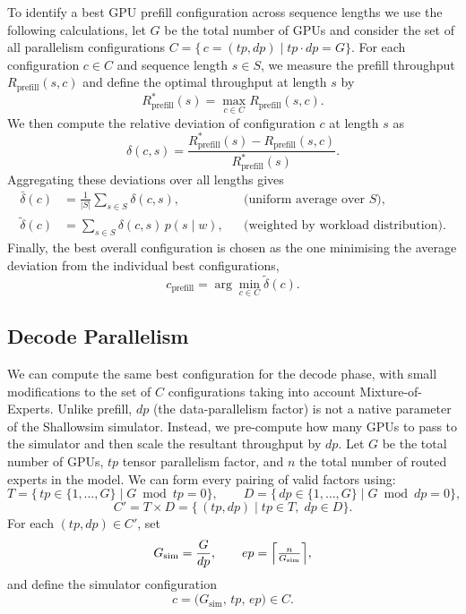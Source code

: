 To identify a best GPU prefill configuration across sequence lengths we use the following calculations, let \(G\) be the total number of GPUs and consider the set of all parallelism configurations $C = \{\,c = (\mathit{tp},\mathit{dp}) \mid \mathit{tp}\cdot\mathit{dp} = G\}$.
For each configuration \(c\in C\) and sequence length \(s\in S\), we measure the prefill throughput \(R_{\mathrm{prefill}}(s,c)\) and define the optimal throughput at length \(s\) by
\[
R_{\mathrm{prefill}}^*(s) = \max_{c\in C} R_{\mathrm{prefill}}(s,c).
\]
We then compute the relative deviation of configuration \(c\) at length \(s\) as
\[
\delta(c,s) = \frac{R_{\mathrm{prefill}}^*(s) - R_{\mathrm{prefill}}(s,c)}{R_{\mathrm{prefill}}^*(s)}.
\]
Aggregating these deviations over all lengths gives
\[
\begin{aligned}
\bar{\delta}(c) &= \frac{1}{\lvert S\rvert} \sum_{s\in S} \delta(c,s), 
&&\text{(uniform average over \(S\))},\\
\widetilde{\delta}(c) &= \sum_{s\in S} \delta(c,s)\,p(s\mid w),
&&\text{(weighted by workload distribution)}.
\end{aligned}
\]
Finally, the best overall configuration is chosen as the one minimising the average deviation from the individual best configurations,
\[
c_{\mathrm{prefill}} = \arg\min_{c\in C} \widetilde{\delta}(c).
\]

\subsection{Decode Parallelism}
\label{chap:decode-parallelism}

We can compute the same best configuration for the decode phase, with small modifications to the set of $C$ configurations taking into account Mixture-of-Experts.
Unlike prefill, \(dp\) (the data-parallelism factor) is not a native parameter of the Shallowsim simulator.
Instead, we pre-compute how many GPUs to pass to the simulator and then scale the resultant throughput by \(dp\).
Let \(G\) be the total number of GPUs, \(tp\) tensor parallelism factor, and \(n\) the total number of routed experts in the model.
We can form every pairing of valid factors using:
\[
T = \{\,tp \in \{1,\dots,G\}\mid G \bmod tp = 0\}, 
\qquad
D = \{\,dp \in \{1,\dots,G\}\mid G \bmod dp = 0\},
\]
\[
C' = T \times D = \{\, (tp,dp) \mid tp\in T,\; dp\in D\}.
\]
For each \((tp,dp)\in C'\), set
\[
G_{\mathrm{sim}} = \frac{G}{dp},
\qquad
ep = \Bigl\lceil \tfrac{n}{G_{\mathrm{sim}}}\Bigr\rceil,
\]
and define the simulator configuration 
\[
c = \bigl(G_{\mathrm{sim}},\,tp,\,ep\bigr)\in C.
\]

